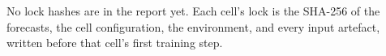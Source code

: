 No lock hashes are in the report yet. Each cell's lock is the SHA-256 of the forecasts, the cell configuration, the environment, and every input artefact, written before that cell's first training step.
